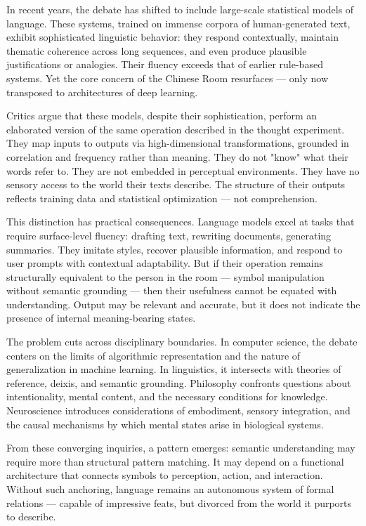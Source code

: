 In recent years, the debate has shifted to include large-scale statistical models of language. These systems, trained on immense corpora of human-generated text, exhibit sophisticated linguistic behavior: they respond contextually, maintain thematic coherence across long sequences, and even produce plausible justifications or analogies. Their fluency exceeds that of earlier rule-based systems. Yet the core concern of the Chinese Room resurfaces — only now transposed to architectures of deep learning.

Critics argue that these models, despite their sophistication, perform an elaborated version of the same operation described in the thought experiment. They map inputs to outputs via high-dimensional transformations, grounded in correlation and frequency rather than meaning. They do not "know" what their words refer to. They are not embedded in perceptual environments. They have no sensory access to the world their texts describe. The structure of their outputs reflects training data and statistical optimization — not comprehension.

This distinction has practical consequences. Language models excel at tasks that require surface-level fluency: drafting text, rewriting documents, generating summaries. They imitate styles, recover plausible information, and respond to user prompts with contextual adaptability. But if their operation remains structurally equivalent to the person in the room — symbol manipulation without semantic grounding — then their usefulness cannot be equated with understanding. Output may be relevant and accurate, but it does not indicate the presence of internal meaning-bearing states.

The problem cuts across disciplinary boundaries. In computer science, the debate centers on the limits of algorithmic representation and the nature of generalization in machine learning. In linguistics, it intersects with theories of reference, deixis, and semantic grounding. Philosophy confronts questions about intentionality, mental content, and the necessary conditions for knowledge. Neuroscience introduces considerations of embodiment, sensory integration, and the causal mechanisms by which mental states arise in biological systems.

From these converging inquiries, a pattern emerges: semantic understanding may require more than structural pattern matching. It may depend on a functional architecture that connects symbols to perception, action, and interaction. Without such anchoring, language remains an autonomous system of formal relations — capable of impressive feats, but divorced from the world it purports to describe.

